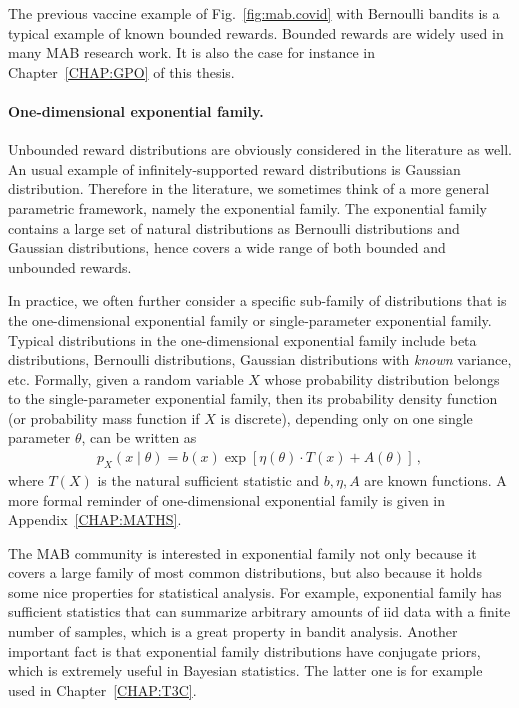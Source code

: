 The previous vaccine example of Fig.~\ref{fig:mab.covid} with Bernoulli bandits is a typical example of known bounded rewards. Bounded rewards are widely used in many MAB research work. It is also the case for instance in Chapter~\ref{CHAP:GPO} of this thesis.

\paragraph{One-dimensional exponential family.}

Unbounded reward distributions are obviously considered in the literature as well. An usual example of infinitely-supported reward distributions is Gaussian distribution. Therefore in the literature, we sometimes think of a more general parametric framework, namely the exponential family. The exponential family contains a large set of natural distributions as Bernoulli distributions and Gaussian distributions, hence covers a wide range of both bounded and unbounded rewards.

In practice, we often further consider a specific sub-family of distributions that is the \gls{one-dimensional exponential family} or \gls{single-parameter exponential family}. Typical distributions in the one-dimensional exponential family include beta distributions, Bernoulli distributions, Gaussian distributions with \emph{known} variance, etc. Formally, given a random variable $X$ whose probability distribution belongs to the single-parameter exponential family, then its \gls{probability density function} (or \gls{probability mass function} if $X$ is discrete), depending only on one single parameter $\theta$, can be written as
\begin{align}\label{eq:mab.exponential}
    p_{X}(x \mid \theta ) = b(x) \exp \left[\eta (\theta ) \cdot T(x) + A(\theta )\right]\,,
\end{align}
where $T(X)$ is the \gls{natural sufficient statistic} and $b,\eta,A$ are known functions. A more formal reminder of one-dimensional exponential family is given in Appendix~\ref{CHAP:MATHS}.

The MAB community is interested in exponential family not only because it covers a large family of most common distributions, but also because it holds some nice properties for statistical analysis. For example, exponential family has sufficient statistics that can summarize arbitrary amounts of \gls{iid} data with a finite number of samples, which is a great property in bandit analysis. Another important fact is that exponential family distributions have conjugate priors, which is extremely useful in Bayesian statistics. The latter one is for example used in Chapter~\ref{CHAP:T3C}.

